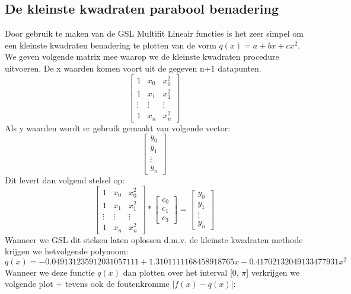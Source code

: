 \documentclass[10pt,a4paper]{article}
\begin{document}
\subsection{De kleinste kwadraten parabool benadering}
Door gebruik te maken van de GSL Multifit Lineair functies is het zeer simpel om een kleinste kwadraten benadering te plotten van de vorm $q(x) = a+bx+cx^{2}$. We geven volgende matrix mee waarop we de kleinste kwadraten procedure uitvoeren. De x waarden komen voort uit de gegeven n+1 datapunten. 
$$
\begin{bmatrix}
1 & x_{0} & x_{0}^{2} \\
1 & x_{1} & x_{1}^{2} \\
\vdots & \vdots & \vdots \\
1 & x_{n} & x_{n}^{2}
\end{bmatrix}
$$
Als y waarden wordt er gebruik gemaakt van volgende vector:
$$
\begin{bmatrix}
y_{0} \\
y_{1}\\
\vdots \\
y_{n}
\end{bmatrix}
$$
Dit levert dan volgend stelsel op:
$$
\begin{bmatrix}
1 & x_{0} & x_{0}^{2} \\
1 & x_{1} & x_{1}^{2} \\
\vdots & \vdots & \vdots \\
1 & x_{n} & x_{n}^{2}
\end{bmatrix}
*
\begin{bmatrix}
c_{0} \\
c_{1}\\
c_{3}
\end{bmatrix}
=
\begin{bmatrix}
y_{0} \\
y_{1}\\
\vdots \\
y_{n}
\end{bmatrix}
$$
Wanneer we GSL dit stelsen laten oplossen d.m.v. de kleinste kwadraten methode krijgen we hetvolgende polynoom:
$$
q(x) =  -0.049131235912031057111 +1.3101111168458918765x -0.41702132049133477931x^{2}
$$
Wanneer we deze functie $q(x)$ dan plotten over het interval [0, $\pi$] verkrijgen we volgende plot + tevens ook de foutenkromme $\left | f(x) - q(x)  \right |$:
\end{document}
